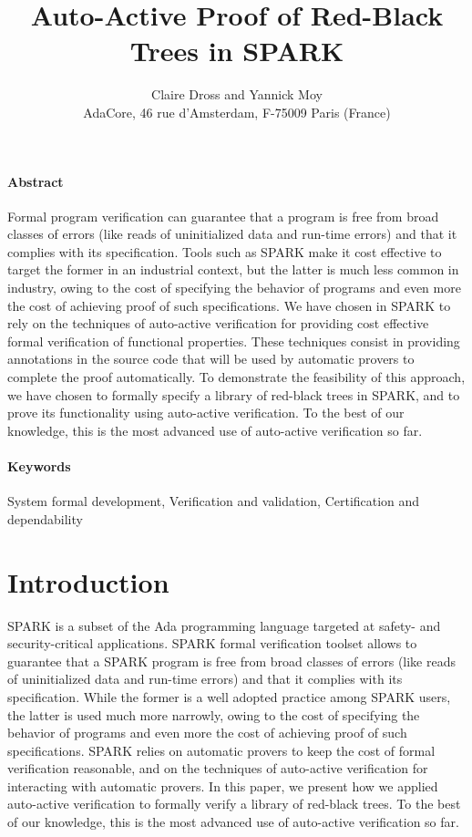 \documentclass[11pt,a4paper]{article}
\newcommand{\spark}{SPARK\xspace}
\begin{document}
\title{Auto-Active Proof of Red-Black Trees in \spark}

\author{%
\large Claire Dross and Yannick Moy\\
\normalsize AdaCore, 46 rue d'Amsterdam, F-75009 Paris (France)}

\date{}

\maketitle

\paragraph{Abstract}
Formal program verification can guarantee that a program is free from broad
classes of errors (like reads of uninitialized data and run-time errors) and
that it complies with its specification. Tools such as \spark make it cost
effective to target the former in an industrial context, but the latter is much
less common in industry, owing to the cost of specifying the behavior of
programs and even more the cost of achieving proof of such specifications. We
have chosen in \spark to rely on the techniques of auto-active verification for
providing cost effective formal verification of functional properties. These
techniques consist in providing annotations in the source code that will be
used by automatic provers to complete the proof automatically. To demonstrate
the feasibility of this approach, we have chosen to formally specify a library
of red-black trees in \spark, and to prove its functionality using auto-active
verification. To the best of our knowledge, this is the most advanced use of
auto-active verification so far.

\paragraph{Keywords}
System formal development, Verification and validation,
Certification and dependability

\section{Introduction}

\spark is a subset of the Ada programming language targeted at safety- and
security-critical applications. \spark formal verification toolset allows to
guarantee that a \spark program is free from broad classes of errors (like reads
of uninitialized data and run-time errors) and that it complies with its
specification. While the former is a well adopted practice among \spark users,
the latter is used much more narrowly, owing to the cost of specifying the
behavior of programs and even more the cost of achieving proof of such
specifications. \spark relies on automatic provers to keep the cost of formal
verification reasonable, and on the techniques of auto-active verification for
interacting with automatic provers. In this paper, we present how we applied
auto-active verification to formally verify a library of red-black trees. To
the best of our knowledge, this is the most advanced use of auto-active
verification so far.
\end{document}
